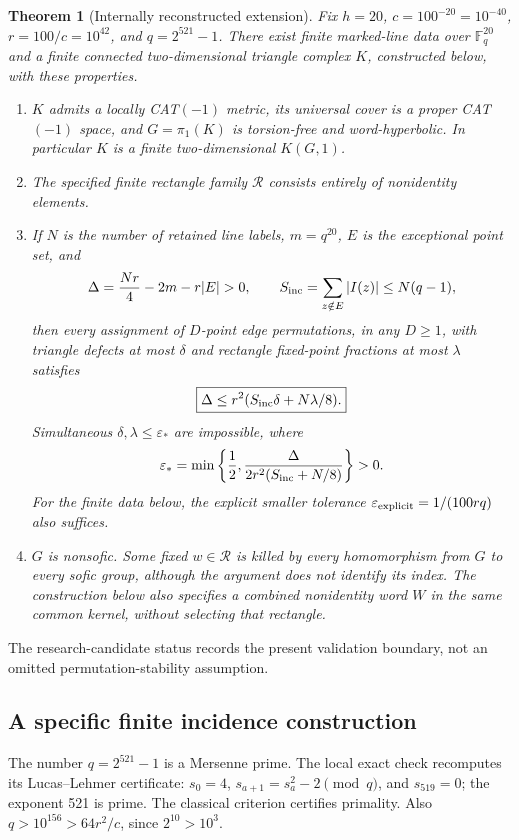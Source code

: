 \documentclass[11pt]{article}
\newtheorem{theorem}{Theorem}[section]
\theoremstyle{definition}
\newcommand{\F}{\mathbb F}
\newcommand{\eps}{\varepsilon}
\begin{document}
\begin{theorem}[Internally reconstructed extension]\label{thm:main}
Fix $h=20$, $c=100^{-20}=10^{-40}$, $r=100/c=10^{42}$, and
$q=2^{521}-1$. There exist finite marked-line data over $\F_q^{20}$
and a finite connected two-dimensional triangle complex $K$, constructed
below, with these properties.
\begin{enumerate}
\item $K$ admits a locally CAT$(-1)$ metric, its universal cover is a
proper CAT$(-1)$ space, and $G=\pi_1(K)$ is torsion-free and
word-hyperbolic. In particular $K$ is a finite two-dimensional $K(G,1)$.
\item The specified finite rectangle family $\mathcal R$ consists
entirely of nonidentity elements.
\item If $N$ is the number of retained line labels, $m=q^{20}$,
$E$ is the exceptional point set, and
\[
 \Delta=\frac{Nr}{4}-2m-r|E|>0,\qquad
 S_{\rm inc}=\sum_{z\notin E}|I(z)|\le N(q-1),
\]
then every assignment of $D$-point edge permutations, in any $D\ge1$,
with triangle defects at most $\delta$ and rectangle fixed-point
fractions at most $\lambda$ satisfies
\begin{equation}\label{eq:robust}
 \boxed{\Delta\le r^2(S_{\rm inc}\delta+N\lambda/8).}
\end{equation}
Simultaneous $\delta,\lambda\le\eps_*$ are impossible, where
\[
 \eps_*=\min\left\{\frac12,\frac{\Delta}
 {2r^2(S_{\rm inc}+N/8)}\right\}>0.
\]
For the finite data below, the explicit smaller tolerance
$\eps_{\rm explicit}=1/(100rq)$ also suffices.
\item $G$ is nonsofic. Some fixed $w\in\mathcal R$ is killed by
every homomorphism from $G$ to every sofic group, although the argument
does not identify its index. The construction below also specifies a
combined nonidentity word $W$ in the same common kernel, without
selecting that rectangle.
\end{enumerate}
\end{theorem}

The research-candidate status records the present validation boundary,
not an omitted permutation-stability assumption.

\subsection{A specific finite incidence construction}
The number $q=2^{521}-1$ is a Mersenne prime. The local exact check
recomputes its Lucas--Lehmer certificate: $s_0=4$,
$s_{a+1}=s_a^2-2\pmod q$, and $s_{519}=0$; the exponent 521 is prime.
The classical criterion \cite{gimps} certifies primality. Also
$q>10^{156}>64r^2/c$, since $2^{10}>10^3$.
\end{document}
